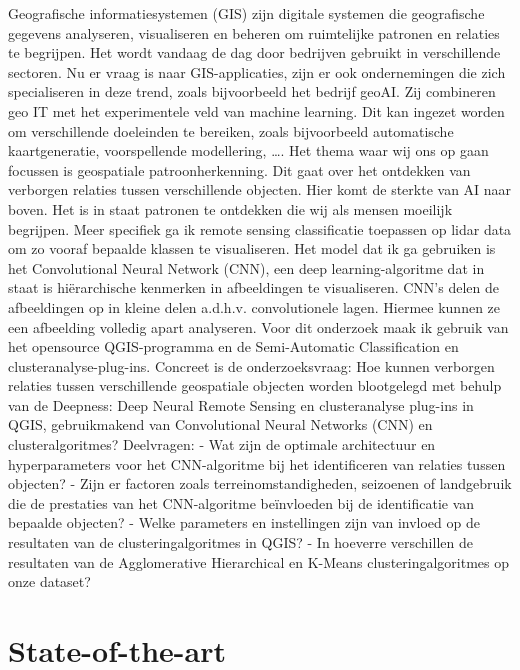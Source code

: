 Geografische informatiesystemen (GIS) zijn digitale systemen die geografische gegevens analyseren, visualiseren en beheren om ruimtelijke 
patronen en relaties te begrijpen. Het wordt vandaag de dag door bedrijven gebruikt in verschillende sectoren. 
Nu er vraag is naar GIS-applicaties, zijn er ook ondernemingen die zich specialiseren in deze trend, zoals bijvoorbeeld het bedrijf geoAI. 
Zij combineren geo IT met het experimentele veld van machine learning. Dit kan ingezet worden om verschillende doeleinden te bereiken, zoals
bijvoorbeeld automatische kaartgeneratie, voorspellende modellering, \ldots. 
Het thema waar wij ons op gaan focussen is geospatiale patroonherkenning. Dit gaat over het ontdekken van verborgen relaties tussen 
verschillende objecten. Hier komt de sterkte van AI naar boven. Het is in staat patronen te ontdekken die wij als mensen moeilijk begrijpen. 
Meer specifiek ga ik remote sensing classificatie toepassen op lidar data om zo vooraf bepaalde klassen te visualiseren. Het model dat ik ga 
gebruiken is het Convolutional Neural Network (CNN), een deep learning-algoritme dat in staat is hiërarchische kenmerken in afbeeldingen 
te visualiseren. CNN's delen de afbeeldingen op in kleine delen a.d.h.v. convolutionele lagen. Hiermee kunnen ze een afbeelding volledig apart
analyseren. Voor dit onderzoek maak ik gebruik van het opensource QGIS-programma en de Semi-Automatic Classification en clusteranalyse-plug-ins.
Concreet is de onderzoeksvraag: Hoe kunnen verborgen relaties tussen verschillende geospatiale objecten worden 
blootgelegd met behulp van de Deepness: Deep Neural Remote Sensing en clusteranalyse plug-ins in QGIS, gebruikmakend van Convolutional 
Neural Networks (CNN) en clusteralgoritmes?
Deelvragen: 
- Wat zijn de optimale architectuur en hyperparameters voor het CNN-algoritme bij het identificeren van relaties tussen objecten?
- Zijn er factoren zoals terreinomstandigheden, seizoenen of landgebruik die de prestaties van het CNN-algoritme beïnvloeden bij de identificatie van bepaalde objecten?
- Welke parameters en instellingen zijn van invloed op de resultaten van de clusteringalgoritmes in QGIS?
- In hoeverre verschillen de resultaten van de Agglomerative Hierarchical en K-Means clusteringalgoritmes op onze dataset?



\section{State-of-the-art}%
\label{sec:state-of-the-art}

